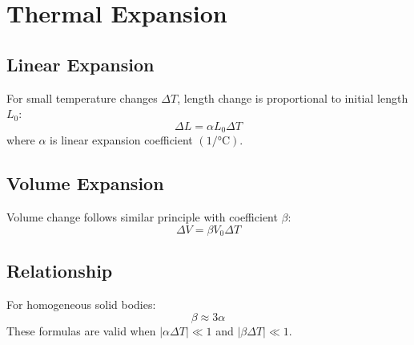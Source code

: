 \documentclass{article}
\begin{document}
\section*{Thermal Expansion}

\subsection*{Linear Expansion}
For small temperature changes $\Delta T$, length change is proportional to initial length $L_0$:
\[
\Delta L = \alpha L_0 \Delta T
\]
where $\alpha$ is linear expansion coefficient $(1/°\mathrm{C})$.

\subsection*{Volume Expansion}
Volume change follows similar principle with coefficient $\beta$:
\[
\Delta V = \beta V_0 \Delta T
\]

\subsection*{Relationship}
For homogeneous solid bodies:
\[
\beta \approx 3\alpha
\]
These formulas are valid when $|\alpha\Delta T| \ll 1$ and $|\beta\Delta T| \ll 1$.
\end{document}
